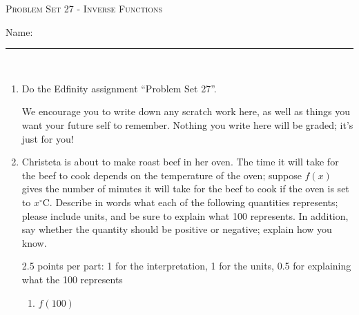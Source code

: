 \documentclass{article}
\newcommand{\doedfinity}[2][\newpage]{
  \begin{problem}[#1]
    Do the Edfinity assignment ``Problem Set #2''.

    We encourage you to write down any scratch work here, as well as
    things you want your future self to remember. Nothing you write
    here will be graded; it's just for you!
  \end{problem}
}
\begin{document}
\begin{center}
  \large\textsc{Problem Set 27 - Inverse Functions}\vspace{.5in}\\
  \begin{problemonly}
   \large Name: \rule{5cm}{0.15mm}\\
   \end{problemonly}
\end{center}

\begin{enumerate}
\item  {}

  \doedfinity{27}

\item  

  Christeta is about to make roast beef in her oven. The time it will take for the beef to cook depends on the temperature of the oven; suppose $f(x)$ gives the number of minutes it will take for the beef to cook if the oven is set to $x^\circ$C. Describe in words what each of the following quantities represents; please include units, and be sure to explain what 100 represents. In addition, say whether the quantity should be positive or negative; explain how you know. 

  \begin{grading}
    2.5 points per part: 1 for the interpretation, 1 for the units, 0.5 for explaining what the 100 represents
  \end{grading}

  \begin{enumerate}
  \item
    \begin{problem}[\vfill]
      $f(100)$
    \end{problem}


\end{enumerate}
\end{enumerate}
\end{document}
